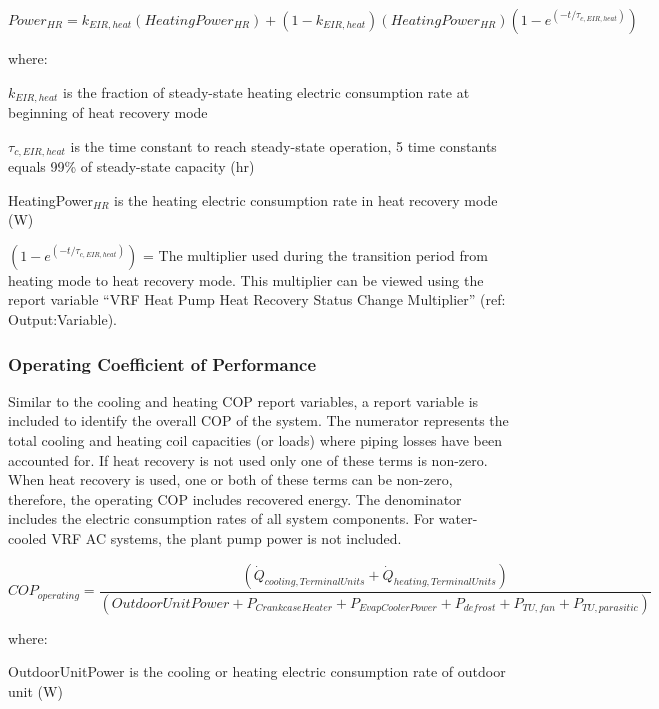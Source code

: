 \begin{equation}
  Power_{HR} = k_{EIR,heat} \left( HeatingPower_{HR} \right) + \left( 1 - k_{EIR,heat} \right) \left( HeatingPower_{HR} \right) \left( 1 - e^{\left( -t / \tau_{c,EIR,heat} \right)} \right)
\end{equation}

where:

\(k_{EIR,heat}\) is the fraction of steady-state heating electric consumption rate at beginning of heat recovery mode

\(\tau_{c,EIR,heat}\) is the time constant to reach steady-state operation, 5 time constants equals 99\% of steady-state capacity (hr)

HeatingPower\(_{HR}\) is the heating electric consumption rate in heat recovery mode (W)

\(\left( 1 - e^{\left( -t / \tau_{c,EIR,heat} \right)} \right)\) = The multiplier used during the transition period from heating mode to heat recovery mode. This multiplier can be viewed using the report variable ``VRF Heat Pump Heat Recovery Status Change Multiplier'' (ref: Output:Variable).

\subsubsection{Operating Coefficient of Performance}\label{operating-coefficient-of-performance}

Similar to the cooling and heating COP report variables, a report variable is included to identify the overall COP of the system. The numerator represents the total cooling and heating coil capacities (or loads) where piping losses have been accounted for. If heat recovery is not used only one of these terms is non-zero. When heat recovery is used, one or both of these terms can be non-zero, therefore, the operating COP includes recovered energy. The denominator includes the electric consumption rates of all system components. For water-cooled VRF AC systems, the plant pump power is not included.

\begin{equation}
  COP_{operating} = \frac{\left( \dot{Q}_{cooling,TerminalUnits} + \dot{Q}_{heating,TerminalUnits} \right)}{\left( OutdoorUnitPower + P_{CrankcaseHeater} + P_{EvapCoolerPower} + P_{defrost} + P_{TU,fan} + P_{TU,parasitic} \right)}
\end{equation}

where:

OutdoorUnitPower is the cooling or heating electric consumption rate of outdoor unit (W)

